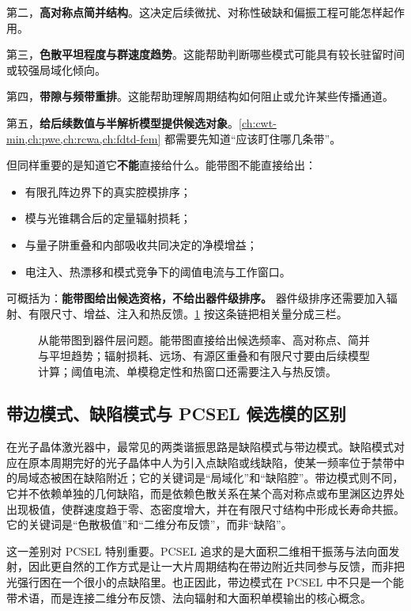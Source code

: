 第二，\textbf{高对称点简并结构}。这决定后续微扰、对称性破缺和偏振工程可能怎样起作用。

第三，\textbf{色散平坦程度与群速度趋势}。这能帮助判断哪些模式可能具有较长驻留时间或较强局域化倾向。

第四，\textbf{带隙与频带重排}。这能帮助理解周期结构如何阻止或允许某些传播通道。

第五，\textbf{给后续数值与半解析模型提供候选对象}。\cref{ch:cwt-min,ch:pwe,ch:rcwa,ch:fdtd-fem} 都需要先知道“应该盯住哪几条带”。

但同样重要的是知道它\textbf{不能}直接给什么。能带图不能直接给出：
\begin{itemize}
  \item 有限孔阵边界下的真实腔模排序；
  \item 模与光锥耦合后的定量辐射损耗；
  \item 与量子阱重叠和内部吸收共同决定的净模增益；
  \item 电注入、热漂移和模式竞争下的阈值电流与工作窗口。
\end{itemize}

可概括为：\textbf{能带图给出候选资格，不给出器件级排序。} 器件级排序还需要加入辐射、有限尺寸、增益、注入和热反馈。\cref{fig:ch05_band_diagram_guardrails} 按这条链把相关量分成三栏。

\begin{figure}[htbp]
  \centering
  
  \caption{从能带图到器件层问题。能带图直接给出候选频率、高对称点、简并与平坦趋势；辐射损耗、远场、有源区重叠和有限尺寸要由后续模型计算；阈值电流、单模稳定性和热窗口还需要注入与热反馈。}
  \label{fig:ch05_band_diagram_guardrails}
\end{figure}

\subsection{带边模式、缺陷模式与 PCSEL 候选模的区别}

在光子晶体激光器中，最常见的两类谐振思路是缺陷模式与带边模式。缺陷模式对应在原本周期完好的光子晶体中人为引入点缺陷或线缺陷，使某一频率位于禁带中的局域态被困在缺陷附近；它的关键词是“局域化”和“缺陷腔”。带边模式则不同，它并不依赖单独的几何缺陷，而是依赖色散关系在某个高对称点或布里渊区边界处出现极值，使群速度趋于零、态密度增大，并在有限尺寸结构中形成长寿命共振。它的关键词是“色散极值”和“二维分布反馈”，而非“缺陷”。

这一差别对 PCSEL 特别重要。PCSEL 追求的是大面积二维相干振荡与法向面发射，因此更自然的工作方式是让一大片周期结构在带边附近共同参与反馈，而非把光强行困在一个很小的点缺陷里。也正因此，带边模式在 PCSEL 中不只是一个能带术语，而是连接二维分布反馈、法向辐射和大面积单模输出的核心概念。

